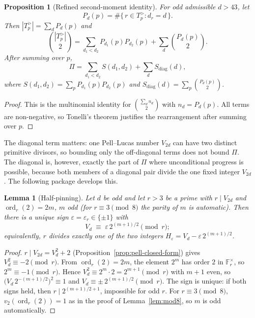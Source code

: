 \documentclass[11pt]{amsart}
\theoremstyle{plain}
\newtheorem{proposition}[theorem]{Proposition}
\newtheorem{lemma}[theorem]{Lemma}
\theoremstyle{definition}
\theoremstyle{remark}
\numberwithin{equation}{section}
\newcommand{\ord}{\operatorname{ord}}
\newcommand{\F}{\mathbb{F}}
\begin{document}
\begin{proposition}[Refined second-moment identity]\label{prop:refined-second-moment}
For odd admissible $d>43$, let
\[
  P_d(p)=\#\{\,r\in T_p^{>}: d_r=d\,\}.
\]
Then $|T_p^{>}|=\sum_d P_d(p)$ and
\[
  \binom{|T_p^{>}|}{2}
  =\sum_{d_1<d_2}P_{d_1}(p)P_{d_2}(p)
   +\sum_d \binom{P_d(p)}{2}.
\]
After summing over $p$,
\[
  \Pi=\sum_{d_1<d_2}S(d_1,d_2)+\sum_d S_{\mathrm{diag}}(d),
\]
where $S(d_1,d_2)=\sum_pP_{d_1}(p)P_{d_2}(p)$ and $S_{\mathrm{diag}}(d)=\sum_p\binom{P_d(p)}{2}$.
\end{proposition}

\begin{proof}
This is the multinomial identity for $\binom{\sum_d n_d}{2}$ with $n_d=P_d(p)$. All terms are non-negative, so Tonelli's theorem justifies the rearrangement after summing over $p$.
\end{proof}

The diagonal term matters: one Pell--Lucas number $V_{2d}$ can have two distinct primitive divisors, so bounding only the off-diagonal terms does not bound $\Pi$. The diagonal is, however, exactly the part of $\Pi$ where unconditional progress is possible, because both members of a diagonal pair divide the one fixed integer $V_{2d}$. The following package develops this.

\begin{lemma}[Half-pinning]\label{lem:half-pinning}
Let $d$ be odd and let $r > 3$ be a prime with $r \mid V_{2d}$ and $\ord_r(2) = 2m$, $m$ odd (for $r \equiv 3 \pmod 8$ the parity of $m$ is automatic). Then there is a unique sign $\varepsilon = \varepsilon_r \in \{\pm 1\}$ with
\[
  V_d \;\equiv\; \varepsilon \, 2^{(m+1)/2} \pmod r;
\]
equivalently, $r$ divides exactly one of the two integers $H_{\varepsilon} = V_d - \varepsilon\, 2^{(m+1)/2}$.
\end{lemma}

\begin{proof}
$r \mid V_{2 d} = V_d^2 + 2$ (Proposition~\ref{prop:pell-closed-form}) gives $V_d^2 \equiv -2 \pmod r$. From $\ord_r(2) = 2 m$, the element $2^m$ has order $2$ in $\F_r^\times$, so $2^m \equiv -1 \pmod r$. Hence $V_d^2 \equiv 2^m \cdot 2 = 2^{m+1} \pmod r$ with $m + 1$ even, so $\bigl(V_d \, 2^{-(m+1)/2}\bigr)^2 \equiv 1$ and $V_d \equiv \pm\, 2^{(m+1)/2} \pmod r$. The sign is unique: if both signs held, then $r \mid 2^{(m+1)/2 + 1}$, impossible for odd $r$. For $r \equiv 3 \pmod 8$, $v_2(\ord_r(2)) = 1$ as in the proof of Lemma~\ref{lem:mod8}, so $m$ is odd automatically.
\end{proof}
\end{document}
